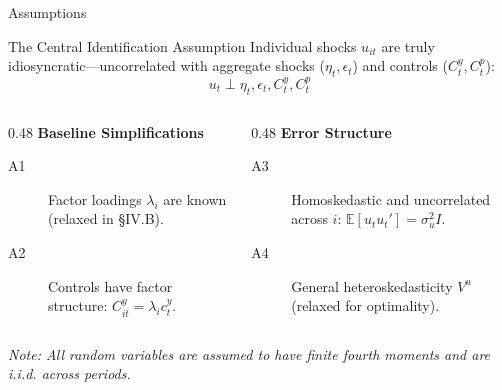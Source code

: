 \documentclass[aspectratio=169,11pt]{beamer}
\begin{document}
\begin{frame}{Assumptions}
    \label{app_assumptions}
    \vspace{-0.5em}
    \begin{block}{The Central Identification Assumption}
        Individual shocks $u_{it}$ are truly idiosyncratic—uncorrelated with aggregate shocks ($\eta_t, \epsilon_t$) and controls ($C_t^y, C_t^p$):
        \begin{equation}
            u_t \perp \eta_t, \epsilon_t, C_t^y, C_t^p
        \end{equation}
    \end{block}

    \vfill

    \begin{columns}[T]
        \begin{column}{0.48\textwidth}
            \textbf{Baseline Simplifications}
            \begin{description}
                \item[A1] Factor loadings $\lambda_i$ are known (relaxed in §IV.B).
                \item[A2] Controls have factor structure: $C_{it}^y = \lambda_i c_t^y$.
            \end{description}
        \end{column}
        \begin{column}{0.48\textwidth}
            \textbf{Error Structure}
            \begin{description}
                \item[A3] Homoskedastic and uncorrelated across $i$: $\mathbb{E}[u_t u_t'] = \sigma_u^2 I$.
                \item[A4] General heteroskedasticity $V^u$ (relaxed for optimality).
            \end{description}
        \end{column}
    \end{columns}

    \vfill
    \footnotesize
    \textit{Note: All random variables are assumed to have finite fourth moments and are i.i.d. across periods.}
    \vspace{0.1cm}
    \hfill \hyperlink{src_assumptions}{}
\end{frame}
\end{document}
